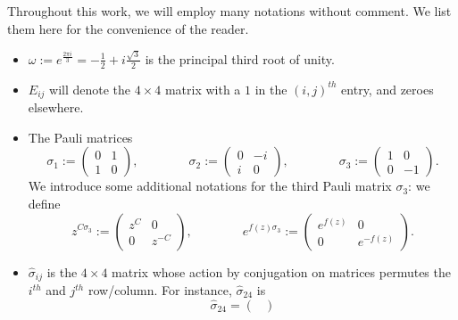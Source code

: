 \documentclass[usenames,dvipsnames]{article}
\theoremstyle{definition}
\numberwithin{equation}{section}
\numberwithin{figure}{section}
\begin{document}
Throughout this work, we will employ many notations without comment. We list them here for the convenience of the reader.
\begin{itemize}
    \item $\omega :=e^{\frac{2\pi i}{3}} = -\frac{1}{2} + i\frac{\sqrt{3}}{2}$ is the principal third root of unity.
    \item $E_{ij}$ will denote the $4\times 4$ matrix with a $1$ in the $(i,j)^{th}$ entry, and zeroes elsewhere.
    \item The Pauli matrices
        \begin{equation*}
            \sigma_{1} :=
            \begin{pmatrix}
                0 & 1\\
                1 & 0
            \end{pmatrix},\qquad\qquad
            \sigma_{2} :=
            \begin{pmatrix}
                0 & -i\\
                i & 0
            \end{pmatrix},\qquad\qquad
            \sigma_{3} :=
            \begin{pmatrix}
                1 & 0\\
                0 & -1
            \end{pmatrix}.
        \end{equation*}
    We introduce some additional notations for the third Pauli matrix $\sigma_3$: we define
        \begin{equation*}
            z^{C\sigma_3} :=
            \begin{pmatrix}
                z^C & 0\\
                0 & z^{-C}
            \end{pmatrix},
            \qquad\qquad
            e^{f(z)\sigma_3} :=
            \begin{pmatrix}
                e^{f(z)} & 0\\
                0 & e^{-f(z)}
            \end{pmatrix}.
        \end{equation*}
    \item $\hat{\sigma}_{ij}$ is the $4\times 4$ matrix whose action by conjugation on matrices permutes the $i^{th}$ and $j^{th}$ row/column. For instance,
    $\hat{\sigma}_{24}$ is
        \begin{equation*}
            \hat{\sigma}_{24} = 
            \begin{pmatrix}

\end{pmatrix}
\end{equation*}
\end{itemize}
\end{document}
